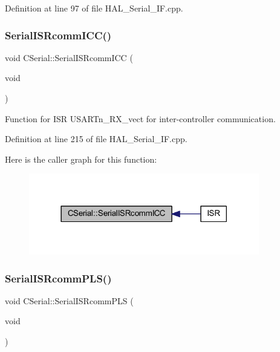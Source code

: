 Definition at line 97 of file H\+A\+L\+\_\+\+Serial\+\_\+\+I\+F.\+cpp.

\mbox{\label{class_c_serial_a974812db5ced18cb9a6a73dc9034e7c8}} 
\subsubsection{\texorpdfstring{Serial\+I\+S\+Rcomm\+I\+C\+C()}{SerialISRcommICC()}}
{\footnotesize\ttfamily void C\+Serial\+::\+Serial\+I\+S\+Rcomm\+I\+CC (\begin{DoxyParamCaption}\item[{void}]{ }\end{DoxyParamCaption})}



Function for I\+SR U\+S\+A\+R\+Tn\+\_\+\+R\+X\+\_\+vect for inter-\/controller communication. 



Definition at line 215 of file H\+A\+L\+\_\+\+Serial\+\_\+\+I\+F.\+cpp.

Here is the caller graph for this function\+:\nopagebreak
\begin{figure}[H]
\begin{center}
\leavevmode
\includegraphics[width=285pt]{class_c_serial_a974812db5ced18cb9a6a73dc9034e7c8_icgraph}
\end{center}
\end{figure}
\mbox{\label{class_c_serial_a707841754d94fc1ab6679f52bf413d85}} 
\subsubsection{\texorpdfstring{Serial\+I\+S\+Rcomm\+P\+L\+S()}{SerialISRcommPLS()}}
{\footnotesize\ttfamily void C\+Serial\+::\+Serial\+I\+S\+Rcomm\+P\+LS (\begin{DoxyParamCaption}\item[{void}]{ }\end{DoxyParamCaption})}



